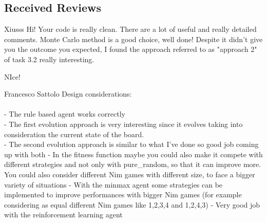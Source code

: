 \subsection{Received Reviews}

\begin{tcolorbox}[colback=green!5!white,colframe=green!75!black,code={\singlespacing}]
    Xiusss
    \tcblower
Hi!
Your code is really clean. There are a lot of useful and really detailed comments.
Monte Carlo method is a good choice, well done!
Despite it didn't give you the outcome you expected, I found the approach referred to as "approach 2" of task 3.2 really interesting.

NIce!
\end{tcolorbox}

\begin{tcolorbox}[colback=green!5!white,colframe=green!75!black,code={\singlespacing}]
    Francesco Sattolo
    \tcblower
Design considerations: \\ \\
- The rule based agent works correctly \\
- The first evolution approach is very interesting since it evolves taking into consideration the current state of the board. \\
- The second evolution approach is similar to what I've done so good job coming up with both
- In the fitness function maybe you could also make it compete with different strategies and not only with pure\_random, so that it can improve more. You could also consider different Nim games with different size, to face a bigger variety of situations
- With the minmax agent some strategies can be implemented to improve performances with bigger Nim games (for example considering as equal different Nim games like 1,2,3,4 and 1,2,4,3)
- Very good job with the reinforcement learning agent \\


\end{tcolorbox}
